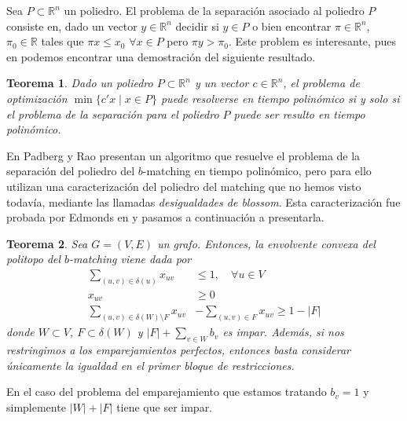 \documentclass[twoside,a4paper,openright,12pt]{book}
\newtheorem{thm}{Teorema}[section]
\newcommand{\R}{\mathbb{R}}
\begin{document}
Sea $P\subset \R^n$ un poliedro. El problema de la separación asociado al poliedro $P$ consiste en, dado un vector $y\in \R^n$ decidir si $y\in P$ o bien encontrar $\pi \in \R^n$, $\pi_0\in\R$ tales que $\pi x \leq x_0$ $\forall x \in P$ pero $\pi y > \pi_0$. Este problem es interesante, pues en \cite{sepa} podemos encontrar una demostración del siguiente resultado.
\begin{thm}
Dado un poliedro $P\subset \R^n$ y un vector $c\in \R^n$, el problema de optimización $\min\{c'x \mid x \in P\}$ puede resolverse en tiempo polinómico si y solo si el problema de la separación para el poliedro $P$ puede ser resulto en tiempo polinómico.
\end{thm}
En \cite{rao} Padberg y Rao presentan un algoritmo que resuelve el problema de la separación del poliedro del $b$-matching en tiempo polinómico, pero para ello utilizan una caracterización del poliedro del matching que no hemos visto todavía, mediante las llamadas \textit{desigualdades de blossom}. Esta caracterización fue probada por Edmonds en \cite{edmond} y pasamos a continuación a presentarla.


\begin{thm}
Sea $G=(V,E)$ un grafo. Entonces, la envolvente convexa del politopo del $b$-matching viene dada por
\begin{align*}
\sum_{(u,v)\in\delta(u)} x_{uv} &\leq 1, \quad \forall u\in V\\
x_{uv} &\geq 0\\
\sum_{(u,v)\in \delta(W)\setminus F}x_{uv}& - \sum_{(u,v)\in F}x_{uv} \geq 1 - |F|
\end{align*}
donde $W\subset V$, $F \subset \delta(W)$ y $|F| + \sum_{v \in W} b_v$ es impar. Además, si nos restringimos a los emparejamientos perfectos, entonces basta considerar únicamente la igualdad en el primer bloque de restricciones.
\end{thm}
En el caso del problema del emparejamiento que estamos tratando $b_v = 1$ y simplemente $|W|+|F|$ tiene que ser impar. 
\end{document}
